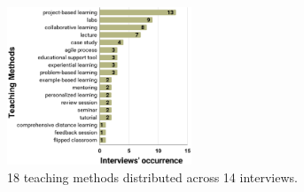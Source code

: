 \documentclass[10pt,conference]{IEEEtran}
\begin{document}
\begin{figure}[ht]
 \centering
  \includegraphics[width=0.49\textwidth]{fig/interviewsResults.pdf}
  \caption{18 teaching methods distributed across 14 interviews.}
  \label{fig:interviewsResults}
\end{figure}    
\end{document}
